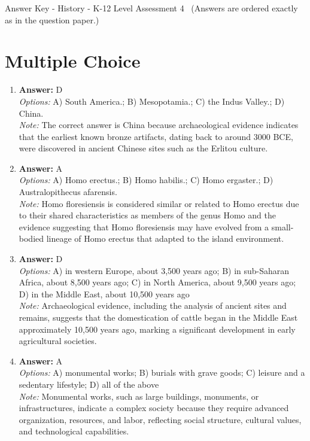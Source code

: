 \documentclass[12pt]{article}
\begin{document}
\begin{center}
Answer Key - History - K-12 Level Assessment 4 \
\small (Answers are ordered exactly as in the question paper.)
\end{center}

\section*{Multiple Choice}
\begin{enumerate}[label=\arabic*.]
\item \textbf{Answer:} D
\\ \textit{Options:} A) South America.; B) Mesopotamia.; C) the Indus Valley.; D) China.
\\ \textit{Note:} The correct answer is China because archaeological evidence indicates that the earliest known bronze artifacts, dating back to around 3000 BCE, were discovered in ancient Chinese sites such as the Erlitou culture.
\item \textbf{Answer:} A
\\ \textit{Options:} A) Homo erectus.; B) Homo habilis.; C) Homo ergaster.; D) Australopithecus afarensis.
\\ \textit{Note:} Homo floresiensis is considered similar or related to Homo erectus due to their shared characteristics as members of the genus Homo and the evidence suggesting that Homo floresiensis may have evolved from a small-bodied lineage of Homo erectus that adapted to the island environment.
\item \textbf{Answer:} D
\\ \textit{Options:} A) in western Europe, about 3,500 years ago; B) in sub-Saharan Africa, about 8,500 years ago; C) in North America, about 9,500 years ago; D) in the Middle East, about 10,500 years ago
\\ \textit{Note:} Archaeological evidence, including the analysis of ancient sites and remains, suggests that the domestication of cattle began in the Middle East approximately 10,500 years ago, marking a significant development in early agricultural societies.
\item \textbf{Answer:} A
\\ \textit{Options:} A) monumental works; B) burials with grave goods; C) leisure and a sedentary lifestyle; D) all of the above
\\ \textit{Note:} Monumental works, such as large buildings, monuments, or infrastructures, indicate a complex society because they require advanced organization, resources, and labor, reflecting social structure, cultural values, and technological capabilities.

\end{enumerate}
\end{document}
